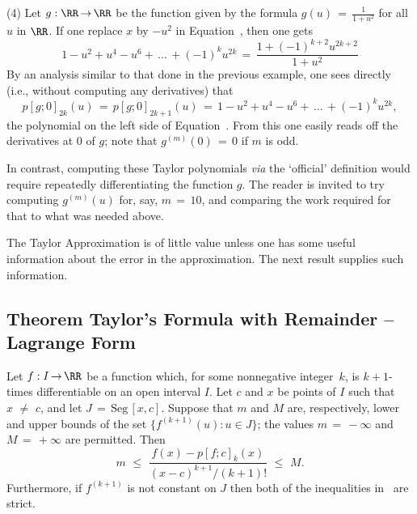 {\V

        (4) Let $g:{\RR} \,{\rightarrow}\, {\RR}$ be the function given by the formula ${\displaystyle g(u) \,=\, \frac{1}{1+u^{2}}}$ for all $u$ in ${\RR}$.
    If one replace $x$ by $-u^{2}$ in Equation~, then one gets
        \begin{equation}
        \label{EqnE.140}
        1-u^{2}+u^{4}-u^{6}+\,{\ldots}\,+ (-1)^{k}u^{2k} \,=\, \frac{1+(-1)^{k+2}u^{2k+2}}{1+u^{2}}
        \end{equation}
    By an analysis similar to that done in the previous example, one sees directly (i.e., without computing any derivatives) that
        \begin{displaymath}
        p[g;0]_{2k}(u) \,=\, p[g;0]_{2k+1}(u) \,=\, 1-u^{2}+u^{4}-u^{6}+\,{\ldots}\,+ (-1)^{k}u^{2k},
        \end{displaymath}
    the polynomial on the left side of Equation~.
    From this one easily reads off the derivatives at $0$ of $g$; note that $g^{(m)}(0) \,=\, 0$ if $m$ is odd.

        In contrast, computing these Taylor polynomials {\em via} the `official' definition would require repeatedly differentiating the function $g$.
    The reader is invited to try computing $g^{(m)}(u)$ for, say, $m \,=\, 10$, and comparing the work required for that to what was needed above.




\VV

        The Taylor Approximation is of little value unless one has some useful information about the error in the approximation.
    The next result supplies such information.

\V

            \subsection{\small{\bf Theorem} Taylor's Formula with Remainder -- Lagrange Form}
            \label{ThmE60.70}

        Let $f:I \,{\rightarrow}\, {\RR}$ be a function which, for some nonnegative integer~$k$, is $k+1$-times differentiable on an open interval $I$.
    Let $c$ and $x$ be points of $I$ such that $x \,\,{\neq}\,\, c$, and let $J \,=\, \mbox{Seg}\,[x,c]$.
    Suppose that $m$ and $M$ are, respectively, lower and upper bounds of the set $\{f^{(k+1)}(u): u{\in}J\}$;
    the values $m \,=\, -{\infty}$ and $M \,=\, +{\infty}$ are permitted. Then
        \begin{equation}
        \label{IneqE.150A}
        m\,\,{\leq}\,\,\frac{f(x) - p[f;c]_{k}(x)}{(x-c)^{k+1}/(k+1)!}\,\,{\leq}\,\,M.
        \end{equation}
    Furthermore, if $f^{(k+1)}$ is not constant on $J$ then both of the inequalities in~ are strict.

}
